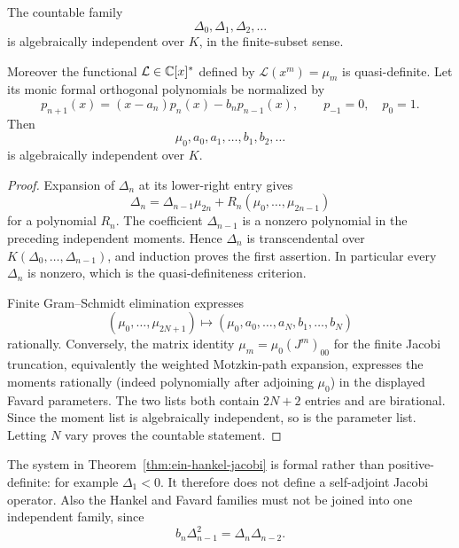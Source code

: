 \begin{theorem}
\label{thm:ein-hankel-jacobi}
The countable family
\[
 \Delta_0,\Delta_1,\Delta_2,\ldots
\]
is algebraically independent over $K$, in the finite-subset sense.

Moreover the functional $\mathcal L\in\mathbb C[x]^*$ defined by
$\mathcal L(x^m)=\mu_m$ is quasi-definite.  Let its monic formal orthogonal
polynomials be normalized by
\begin{equation}\label{eq:ein-favard-recurrence}
 p_{n+1}(x)=(x-a_n)p_n(x)-b_np_{n-1}(x),
 \qquad p_{-1}=0,\quad p_0=1.
\end{equation}
Then
\[
 \mu_0,a_0,a_1,\ldots,b_1,b_2,\ldots
\]
is algebraically independent over $K$.
\end{theorem}

\begin{proof}
Expansion of $\Delta_n$ at its lower-right entry gives
\begin{equation}\label{eq:hankel-triangular-expansion}
 \Delta_n=\Delta_{n-1}\mu_{2n}
 +R_n(\mu_0,\ldots,\mu_{2n-1})
\end{equation}
for a polynomial $R_n$.  The coefficient $\Delta_{n-1}$ is a nonzero
polynomial in the preceding independent moments.  Hence $\Delta_n$ is
transcendental over $K(\Delta_0,\ldots,\Delta_{n-1})$, and induction proves
the first assertion.  In particular every $\Delta_n$ is nonzero, which is
the quasi-definiteness criterion.

Finite Gram--Schmidt elimination expresses
\[
 (\mu_0,\ldots,\mu_{2N+1})
 \longmapsto
 (\mu_0,a_0,\ldots,a_N,b_1,\ldots,b_N)
\]
rationally.  Conversely, the matrix identity
$\mu_m=\mu_0(J^m)_{00}$ for the finite Jacobi truncation, equivalently the
weighted Motzkin-path expansion, expresses the moments rationally (indeed
polynomially after adjoining $\mu_0$) in the displayed Favard parameters.
The two lists both contain $2N+2$ entries and are birational.  Since the
moment list is algebraically independent, so is the parameter list.  Letting
$N$ vary proves the countable statement.
\end{proof}

The system in Theorem~\ref{thm:ein-hankel-jacobi} is formal rather than
positive-definite: for example $\Delta_1<0$.  It therefore does not define
a self-adjoint Jacobi operator.  Also the Hankel and Favard families must
not be joined into one independent family, since
\begin{equation}\label{eq:hankel-favard-dependence}
 b_n\Delta_{n-1}^2=\Delta_n\Delta_{n-2}.
\end{equation}

